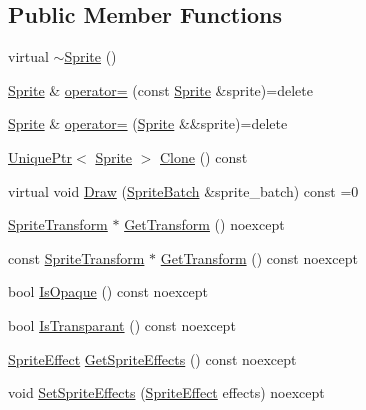 \subsection*{Public Member Functions}
\begin{DoxyCompactItemize}
\item 
virtual \hyperlink{classmage_1_1_sprite_a0f184574f9c035d6fbb239c1868aa670}{$\sim$\+Sprite} ()
\item 
\hyperlink{classmage_1_1_sprite}{Sprite} \& \hyperlink{classmage_1_1_sprite_aa24dfc716d8b79cc16b4c27409f8cc6b}{operator=} (const \hyperlink{classmage_1_1_sprite}{Sprite} \&sprite)=delete
\item 
\hyperlink{classmage_1_1_sprite}{Sprite} \& \hyperlink{classmage_1_1_sprite_a808d87aeb6d652f9a53e967a75a1eede}{operator=} (\hyperlink{classmage_1_1_sprite}{Sprite} \&\&sprite)=delete
\item 
\hyperlink{namespacemage_a3316d7143a973e37adf1110f2e80ca31}{Unique\+Ptr}$<$ \hyperlink{classmage_1_1_sprite}{Sprite} $>$ \hyperlink{classmage_1_1_sprite_a66e27a8a98ac5a4289e8440ef8193718}{Clone} () const
\item 
virtual void \hyperlink{classmage_1_1_sprite_a954a9f2046edcd6b1658a236ae23ec5a}{Draw} (\hyperlink{classmage_1_1_sprite_batch}{Sprite\+Batch} \&sprite\+\_\+batch) const =0
\item 
\hyperlink{structmage_1_1_sprite_transform}{Sprite\+Transform} $\ast$ \hyperlink{classmage_1_1_sprite_aa28e031e38c51619b3bd7853d212ae06}{Get\+Transform} () noexcept
\item 
const \hyperlink{structmage_1_1_sprite_transform}{Sprite\+Transform} $\ast$ \hyperlink{classmage_1_1_sprite_a8e2c0ae634492efacc92aab2e18e701c}{Get\+Transform} () const noexcept
\item 
bool \hyperlink{classmage_1_1_sprite_a8da2f573b61fc381e279931747e7d44e}{Is\+Opaque} () const noexcept
\item 
bool \hyperlink{classmage_1_1_sprite_a0ab488942bb2572a4b62065f0197c618}{Is\+Transparant} () const noexcept
\item 
\hyperlink{namespacemage_a9cfe18123066ba4236f548f9de75d881}{Sprite\+Effect} \hyperlink{classmage_1_1_sprite_a1a969b7cf3f1892894710a80582b4cd2}{Get\+Sprite\+Effects} () const noexcept
\item 
void \hyperlink{classmage_1_1_sprite_abeefc8ed41e55924be83ba7b480aa40e}{Set\+Sprite\+Effects} (\hyperlink{namespacemage_a9cfe18123066ba4236f548f9de75d881}{Sprite\+Effect} effects) noexcept
\end{DoxyCompactItemize}
